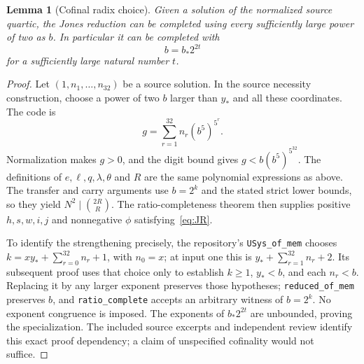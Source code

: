 \documentclass[11pt]{article}
\newtheorem{lemma}[theorem]{Lemma}
\theoremstyle{definition}\newtheorem{definition}[theorem]{Definition}
\begin{document}
\begin{lemma}[Cofinal radix choice]\label{lem:cofinal}
Given a solution of the normalized source quartic, the Jones reduction can be completed using every sufficiently large power of two as $b$. In particular it can be completed with
\[
 b=b_*2^{2t}
\]
for a sufficiently large natural number $t$.
\end{lemma}
\begin{proof}
Let $(1,n_1,\ldots,n_{32})$ be a source solution. In the source necessity construction, choose a power of two $b$ larger than $y_*$ and all these coordinates. The code is
\[
 g=\sum_{r=1}^{32} n_r(b^5)^{5^r}.
\]
Normalization makes $g>0$, and the digit bound gives
$g<b(b^5)^{5^{32}}$. The definitions of $e,\ell,q,\lambda,\theta$ and $R$ are the same polynomial expressions as above. The transfer and carry arguments use $b=2^k$ and the stated strict lower bounds, so they yield
$N^2\mid\binom{2R}{R}$. The ratio-completeness theorem then supplies positive $h,s,w,i,j$ and nonnegative $\phi$ satisfying~\eqref{eq:JR}.

To identify the strengthening precisely, the repository's \texttt{USys\_of\_mem} chooses $k=xy_*+\sum_{r=0}^{32}n_r+1$, with $n_0=x$; at input one this is $y_*+\sum_{r=1}^{32}n_r+2$. Its subsequent proof uses that choice only to establish $k\ge1$, $y_*<b$, and each $n_r<b$. Replacing it by any larger exponent preserves those hypotheses; \texttt{reduced\_of\_mem} preserves $b$, and \texttt{ratio\_complete} accepts an arbitrary witness of $b=2^k$. No exponent congruence is imposed. The exponents of $b_*2^{2t}$ are unbounded, proving the specialization. The included source excerpts and independent review identify this exact proof dependency; a claim of unspecified cofinality would not suffice.
\end{proof}
\end{document}
